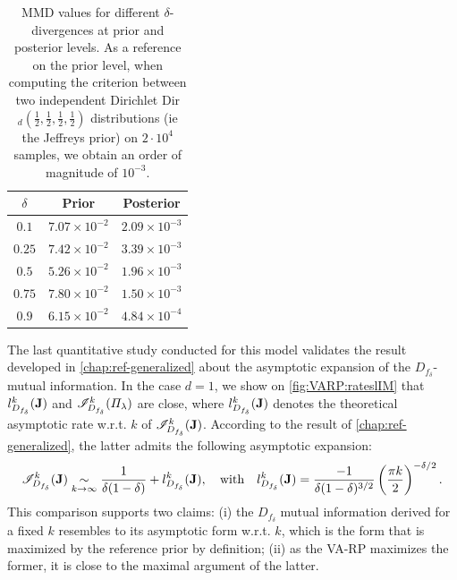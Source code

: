 \begin{table}[h]
\centering
\setlength{\arrayrulewidth}{1.5pt}
\begin{tabular}{|c|c|c|}
\hline
$\delta$ & \textbf{Prior} & \textbf{Posterior}  \\ \hline\hline
$0.1$ & $7.07 \times 10^{-2}$ &  $2.09 \times 10^{-3}$ \\ \hline
$0.25$  & $7.42 \times 10^{-2}$  & $3.39 \times 10^{-3}$  \\ \hline
$0.5$ & $5.26 \times 10^{-2}$ &  $1.96 \times 10^{-3}$   \\ \hline
$0.75$ & $7.80 \times 10^{-2}$ & $1.50 \times 10^{-3}$  \\ \hline 
$0.9$ & $6.15 \times 10^{-2}$ & $4.84 \times 10^{-4}$  \\ \hline 
\end{tabular}
\caption{MMD values for different $\delta$-divergences at prior and posterior levels. As a reference on the prior level, when computing the criterion between two independent Dirichlet Dir$_d(\frac{1}{2},\frac{1}{2},\frac{1}{2},\frac{1}{2})$ distributions (ie the Jeffreys prior) on $2 \cdot 10^4$ samples, we obtain an order of magnitude of $10^{-3}$.}
\label{tab:mmd_multinom}
\end{table}





The last quantitative study conducted for this model validates the result developed in \cref{chap:ref-generalized} about the asymptotic expansion of the $D_{f_\delta}$-mutual information. 
In the case $d=1$, we show on \cref{fig:VARP:rateslIM} that $l_{D_{f_\delta}}^k(\mathbf{J})$ and $\mathscr{I}^k_{D_{f_\delta}}(\varPi_\lambda)$ are close, where $l^k_{D_{f_\delta}}(\mathbf{J})$ denotes
the theoretical asymptotic rate w.r.t. $k$ of 
$\mathscr{I}^k_{D_{f_\delta}}(\mathbf{J})$. According to the result of \cref{chap:ref-generalized}, the latter admits the following asymptotic expansion:
    \begin{equation}
        \mathscr{I}^k_{D_{f_\delta}}(\mathbf{J}) \underset{k\rightarrow\infty}{\sim} \frac{1}{\delta(1-\delta)} + l^k_{D_{f_\delta}}(\mathbf{J}), \quad \text{with} \quad l^k_{D_{f_\delta}}(\mathbf{J}) = \frac{-1}{\delta(1-\delta)^{3/2}}\left( \frac{\pi k}{2} \right)^{-\delta/2}.
    \end{equation}
This comparison
supports two claims: (i) the $D_{f_\delta}$ mutual information derived for a fixed $k$ resembles to its asymptotic form w.r.t. $k$, which is the form that is maximized by the reference prior by definition; (ii) as the VA-RP maximizes the former, it is close to the maximal argument of the latter. 


